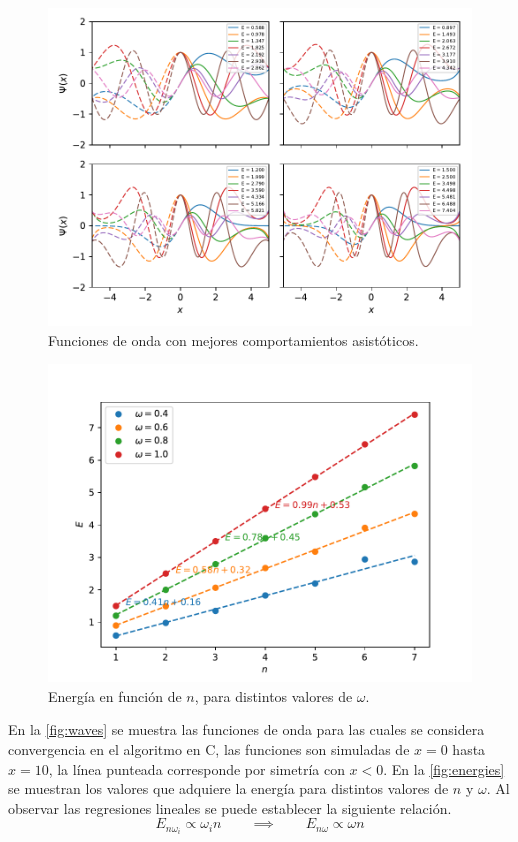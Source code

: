 \documentclass[paper=letter, fontsize=11pt]{scrartcl}
\begin{document}
\newpage


\newpage
\begin{figure}[ht]
	\centering
	\includegraphics[width=0.8\linewidth]{plot.pdf}
	\caption{Funciones de onda con mejores comportamientos asist\'oticos.}
	\label{fig:waves}
\end{figure}
\begin{figure}[h!]
	\centering
	\includegraphics[width=0.5\linewidth]{energies.pdf}
	\caption{Energ\'ia en funci\'on de $n$, para distintos valores de $\omega$.}
	\label{fig:energies}
\end{figure}

En la \autoref{fig:waves} se muestra las funciones de onda para las cuales se considera convergencia en el algoritmo en C, las funciones son simuladas de $x=0$ hasta $x=10$, la l\'inea punteada corresponde por simetr\'ia con $x<0$. En la \autoref{fig:energies} se muestran los valores que adquiere la energ\'ia para distintos valores de $n$ y $\omega$. Al observar las regresiones lineales se puede establecer la siguiente relaci\'on.
\begin{equation}
	E_{n\omega_i} \propto \omega_in \qquad \implies \qquad E_{n\omega} \propto \omega n
\end{equation}
\end{document}
